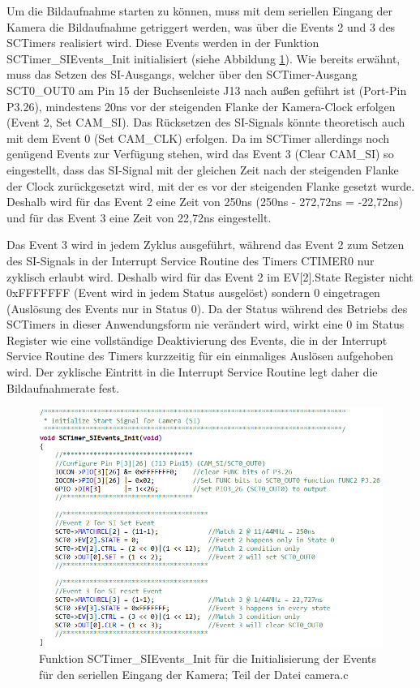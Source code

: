 Um die Bildaufnahme starten zu können, muss mit dem seriellen Eingang der Kamera die Bildaufnahme getriggert werden, was über die Events 2 und 3 des SCTimers realisiert wird. Diese Events werden in der Funktion \glqq{}SCTimer\_SIEvents\_Init\grqq{} initialisiert (siehe Abbildung \ref{fig:SCTimerSIEventsInit}). Wie bereits erwähnt, muss das Setzen des SI-Ausgangs, welcher über den SCTimer-Ausgang SCT0\_OUT0 am Pin 15 der Buchsenleiste J13 nach außen geführt ist (Port-Pin P3.26), mindestens 20ns vor der steigenden Flanke der Kamera-Clock erfolgen (Event 2, Set CAM\_SI). Das Rücksetzen des SI-Signals könnte theoretisch auch mit dem Event 0 (Set CAM\_CLK) erfolgen. Da im SCTimer allerdings noch genügend Events zur Verfügung stehen, wird das Event 3 (Clear CAM\_SI) so eingestellt, dass das SI-Signal mit der gleichen Zeit nach der steigenden Flanke der Clock zurückgesetzt wird, mit der es vor der steigenden Flanke gesetzt wurde. Deshalb wird für das Event 2 eine Zeit von 250ns (250ns - 272,72ns = -22,72ns) und für das Event 3 eine Zeit von 22,72ns eingestellt.\vspace{11pt}

Das Event 3 wird in jedem Zyklus ausgeführt, während das Event 2 zum Setzen des SI-Signals in der Interrupt Service Routine des Timers CTIMER0 nur zyklisch erlaubt wird. Deshalb wird für das Event 2 im EV[2].State Register nicht 0xFFFFFFF (Event wird in jedem Status ausgelöst) sondern 0 eingetragen (Auslösung des Events nur in Status 0). Da der Status während des Betriebs des SCTimers in dieser Anwendungsform nie verändert wird, wirkt eine 0 im Status Register wie eine vollständige Deaktivierung des Events, die in der Interrupt Service Routine des Timers kurzzeitig für ein einmaliges Auslösen aufgehoben wird. Der zyklische Eintritt in die Interrupt Service Routine legt daher die Bildaufnahmerate fest.

\begin{figure}[H] %
\includegraphics[width=.95\textwidth]{sec7/images/code/SCTimerSIEventsInit} 
\centering
\captionsetup{width=.95\textwidth}
\caption[Funktion \glqq{}SCTimer\_SIEvents\_Init\grqq{} aus der Datei \glqq{}camera.c\grqq{}]{Funktion \glqq{}SCTimer\_SIEvents\_Init\grqq{} für die Initialisierung der Events für den seriellen Eingang der Kamera; Teil der Datei \glqq{}camera.c\grqq{}}\centering
\label{fig:SCTimerSIEventsInit}
\end{figure}

